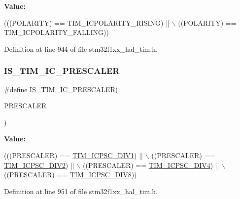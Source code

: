 {\bfseries Value\+:}
\begin{DoxyCode}
(((POLARITY) == TIM\_ICPOLARITY\_RISING)   || \(\backslash\)
                                      ((POLARITY) == TIM\_ICPOLARITY\_FALLING))
\end{DoxyCode}


Definition at line 944 of file stm32f1xx\+\_\+hal\+\_\+tim.\+h.

\mbox{\label{group___t_i_m___private___macros_ga91d219d7a210eb0a4bb49d72bda6b321}} 
\subsubsection{\texorpdfstring{I\+S\+\_\+\+T\+I\+M\+\_\+\+I\+C\+\_\+\+P\+R\+E\+S\+C\+A\+L\+ER}{IS\_TIM\_IC\_PRESCALER}}
{\footnotesize\ttfamily \#define I\+S\+\_\+\+T\+I\+M\+\_\+\+I\+C\+\_\+\+P\+R\+E\+S\+C\+A\+L\+ER(\begin{DoxyParamCaption}\item[{}]{P\+R\+E\+S\+C\+A\+L\+ER }\end{DoxyParamCaption})}

{\bfseries Value\+:}
\begin{DoxyCode}
(((PRESCALER) == \hyperlink{group___t_i_m___input___capture___prescaler_ga8acb44abe3147d883685c1f9f1ce410e}{TIM\_ICPSC\_DIV1}) || \(\backslash\)
                                        ((PRESCALER) == \hyperlink{group___t_i_m___input___capture___prescaler_ga1d8a7b66add914e2ddd910d2d700978f}{TIM\_ICPSC\_DIV2}) || \(\backslash\)
                                        ((PRESCALER) == \hyperlink{group___t_i_m___input___capture___prescaler_gaf5a675046430fa0f0c95b0dac612828f}{TIM\_ICPSC\_DIV4}) || \(\backslash\)
                                        ((PRESCALER) == \hyperlink{group___t_i_m___input___capture___prescaler_ga5086cb03c89a5c67b199d20b605f00cb}{TIM\_ICPSC\_DIV8}))
\end{DoxyCode}


Definition at line 951 of file stm32f1xx\+\_\+hal\+\_\+tim.\+h.

\mbox{\label{group___t_i_m___private___macros_ga623d8592109f4702829ae7fc3806bcb8}} 
